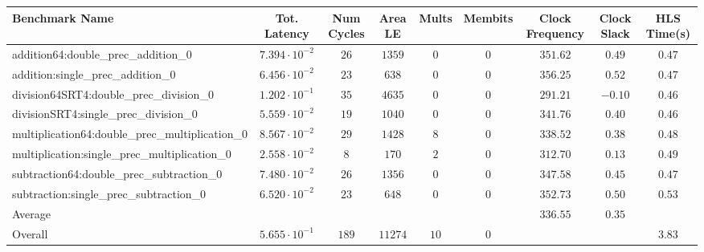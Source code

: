 \begin{tabular}{|l|c|c|c|c|c|c|c|c|}
\hline
Benchmark Name                                   & Tot. Latency            & Num Cycles & Area LE   & Mults  & Membits & Clock Frequency & Clock Slack & HLS Time(s) \\
\hline
addition64:double\_prec\_addition\_0             & $ 7.394 \cdot 10^{-2} $ & $ 26     $ & $ 1359  $ & $ 0  $ & $ 0   $ & $ 351.62      $ & $ 0.49    $ & $ 0.47    $ \\
addition:single\_prec\_addition\_0               & $ 6.456 \cdot 10^{-2} $ & $ 23     $ & $ 638   $ & $ 0  $ & $ 0   $ & $ 356.25      $ & $ 0.52    $ & $ 0.47    $ \\
division64SRT4:double\_prec\_division\_0         & $ 1.202 \cdot 10^{-1} $ & $ 35     $ & $ 4635  $ & $ 0  $ & $ 0   $ & $ 291.21      $ & $ -0.10   $ & $ 0.46    $ \\
divisionSRT4:single\_prec\_division\_0           & $ 5.559 \cdot 10^{-2} $ & $ 19     $ & $ 1040  $ & $ 0  $ & $ 0   $ & $ 341.76      $ & $ 0.40    $ & $ 0.46    $ \\
multiplication64:double\_prec\_multiplication\_0 & $ 8.567 \cdot 10^{-2} $ & $ 29     $ & $ 1428  $ & $ 8  $ & $ 0   $ & $ 338.52      $ & $ 0.38    $ & $ 0.48    $ \\
multiplication:single\_prec\_multiplication\_0   & $ 2.558 \cdot 10^{-2} $ & $ 8      $ & $ 170   $ & $ 2  $ & $ 0   $ & $ 312.70      $ & $ 0.13    $ & $ 0.49    $ \\
subtraction64:double\_prec\_subtraction\_0       & $ 7.480 \cdot 10^{-2} $ & $ 26     $ & $ 1356  $ & $ 0  $ & $ 0   $ & $ 347.58      $ & $ 0.45    $ & $ 0.47    $ \\
subtraction:single\_prec\_subtraction\_0         & $ 6.520 \cdot 10^{-2} $ & $ 23     $ & $ 648   $ & $ 0  $ & $ 0   $ & $ 352.73      $ & $ 0.50    $ & $ 0.53    $ \\
\hline
Average                                          & $                     $ & $        $ & $       $ & $    $ & $     $ & $ 336.55      $ & $ 0.35    $ & $         $ \\
\hline
Overall                                          & $ 5.655 \cdot 10^{-1} $ & $ 189    $ & $ 11274 $ & $ 10 $ & $ 0   $ & $             $ & $         $ & $ 3.83    $ \\
\hline
\end{tabular}
